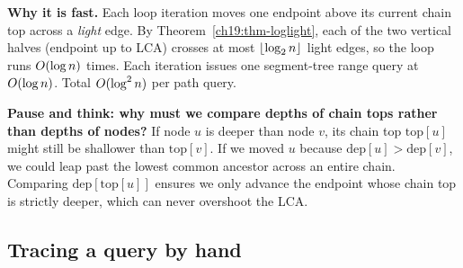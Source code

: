 \begin{whybox}
\textbf{Why it is fast.} Each loop iteration moves one endpoint above its current chain top across a
\emph{light} edge. By Theorem~\ref{ch19:thm-loglight}, each of the two vertical halves
(endpoint up to LCA) crosses at most $\lfloor\log_2 n\rfloor$ light edges, so the loop runs $O(\log n)$
times. Each iteration issues one segment-tree range query at $O(\log n)$. Total $O(\log^2 n)$ per
path query.
\end{whybox}

\begin{recoverybox}
\textbf{Pause and think: why must we compare depths of chain tops rather than depths of nodes?}
If node $u$ is deeper than node $v$, its chain top $\mathrm{top}[u]$ might still be shallower than $\mathrm{top}[v]$. If we moved $u$ because $\mathrm{dep}[u] > \mathrm{dep}[v]$, we could leap past the lowest common ancestor across an entire chain. Comparing $\mathrm{dep}[\mathrm{top}[u]]$ ensures we only advance the endpoint whose chain top is strictly deeper, which can never overshoot the LCA.
\end{recoverybox}

\subsection{Tracing a query by hand}

